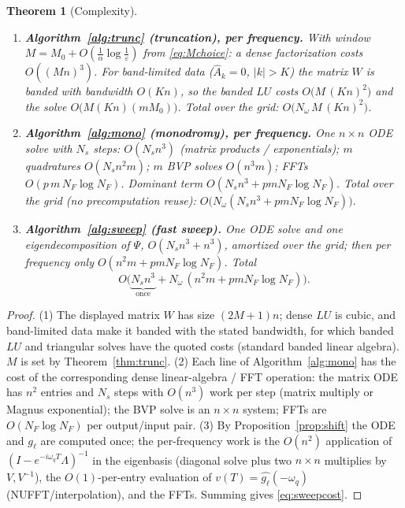 \documentclass{amsart}
\newtheorem{theorem}{Theorem}
\theoremstyle{definition}
\begin{document}
\begin{theorem}[Complexity]\label{thm:complexity}
\leavevmode
\begin{enumerate}
\item \textbf{Algorithm~\ref{alg:trunc} (truncation), per frequency.} With
window $M=M_0+O(\tfrac1\alpha\log\tfrac1\varepsilon)$ from \eqref{eq:Mchoice}: a
dense factorization costs $O((Mn)^3)$. For band-limited data ($\hat A_k=0$,
$|k|>K$) the matrix $W$ is banded with bandwidth $O(Kn)$, so the banded
$LU$ costs $O\!\big(M\,(Kn)^2\big)$ and the solve $O\!\big(M (Kn) (mM_0)\big)$.
Total over the grid: $O\!\big(N_\omega\,M\,(Kn)^2\big)$.
\item \textbf{Algorithm~\ref{alg:mono} (monodromy), per frequency.} One
$n\times n$ ODE solve with $N_s$ steps: $O(N_s n^3)$ (matrix products /
exponentials); $m$ quadratures $O(N_s n^2 m)$; $m$ BVP solves $O(n^3 m)$; FFTs
$O(p\,m\,N_F\log N_F)$. Dominant term $O(N_s n^3 + p m N_F\log N_F)$. Total over
the grid (no precomputation reuse): $O\!\big(N_\omega(N_s n^3+pmN_F\log N_F)\big)$.
\item \textbf{Algorithm~\ref{alg:sweep} (fast sweep).} \emph{One} ODE solve and
\emph{one} eigendecomposition of $\Psi$, $O(N_s n^3+n^3)$, amortized over the
grid; then per frequency only $O(n^2 m + pmN_F\log N_F)$. Total
\begin{equation}\label{eq:sweepcost}
O\!\big(\underbrace{N_s n^3}_{\text{once}}+N_\omega\,(n^2 m+p m N_F\log N_F)\big).
\end{equation}
\end{enumerate}
\end{theorem}

\begin{proof}
(1) The displayed matrix $W$ has size $(2M{+}1)n$; dense $LU$ is cubic, and
band-limited data make it banded with the stated bandwidth, for which banded
$LU$ and triangular solves have the quoted costs (standard banded linear
algebra). $M$ is set by Theorem~\ref{thm:trunc}. (2) Each line of
Algorithm~\ref{alg:mono} has the cost of the corresponding dense linear-algebra
/ FFT operation: the matrix ODE has $n^2$ entries and $N_s$ steps with $O(n^3)$
work per step (matrix multiply or Magnus exponential); the BVP solve is an
$n\times n$ system; FFTs are $O(N_F\log N_F)$ per output/input pair. (3) By
Proposition~\ref{prop:shift} the ODE and $g_\ell$ are computed once; the
per-frequency work is the $O(n^2)$ application of
$(I-e^{-i\omega_q T}\Lambda)^{-1}$ in the eigenbasis (diagonal solve plus two
$n\times n$ multiplies by $V,V^{-1}$), the $O(1)$-per-entry evaluation of
$v(T)=\widehat{g_\ell}(-\omega_q)$ (NUFFT/interpolation), and the FFTs. Summing
gives \eqref{eq:sweepcost}.
\end{proof}
\end{document}
